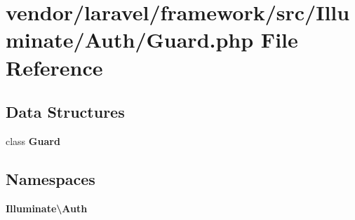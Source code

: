 \section{vendor/laravel/framework/src/\+Illuminate/\+Auth/\+Guard.php File Reference}
\label{_auth_2_guard_8php}
\subsection*{Data Structures}
\begin{DoxyCompactItemize}
\item 
class {\bf Guard}
\end{DoxyCompactItemize}
\subsection*{Namespaces}
\begin{DoxyCompactItemize}
\item 
 {\bf Illuminate\textbackslash{}\+Auth}
\end{DoxyCompactItemize}
